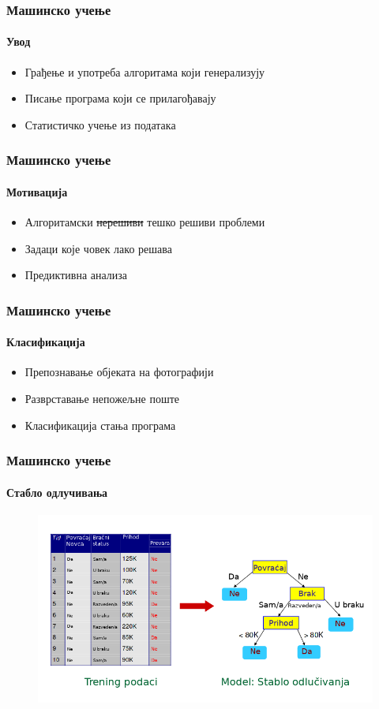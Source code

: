 \documentclass{beamer}
\begin{document}
\begin{frame}
\frametitle{Машинско учење}
\framesubtitle{Увод}
\begin{itemize}
 	\item Грађење и употреба алгоритама који генерализују
	\item Писање програма који се прилагођавају
	\item Статистичко учење из података
\end{itemize}
\end{frame}
\begin{frame}
\frametitle{Машинско учење}
\framesubtitle{Мотивација}
\begin{itemize}
 	\item Алгоритамски \sout{нерешиви} тешко решиви проблеми
 	\item Задаци које човек лако решава
	\item Предиктивна анализа
\end{itemize}
\end{frame}
\begin{frame}
\frametitle{Машинско учење}
\framesubtitle{Класификација}
\begin{itemize}
 	\item Препознавање објеката на фотографији
 	\item Разврставање непожељне поште
 	\item Класификација стања програма
\end{itemize}
\end{frame}
\begin{frame}
\frametitle{Машинско учење}
\framesubtitle{Стабло одлучивања}
\begin{figure}
\centering
\includegraphics[scale=0.4]{slike/decision_tree.png}
\end{figure}
\end{frame}
\end{document}
